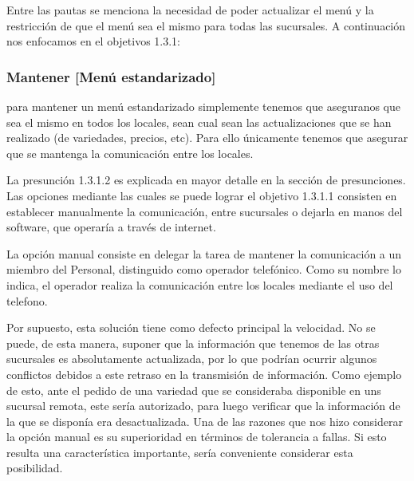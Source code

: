 \documentclass[a4paper,10pt]{article}
\begin{document}
\begin{figure}[H]
\centering
{}
\caption{}
\end{figure}

Entre las pautas se menciona la necesidad de poder actualizar el menú y la restricción de que el menú sea el mismo para todas las sucursales. A continuación nos enfocamos en el objetivos 1.3.1:
\subsubsection*{Mantener [Menú estandarizado]}
para mantener un menú estandarizado simplemente tenemos que aseguranos que sea el mismo en todos los locales, sean cual sean las actualizaciones que se han realizado (de variedades, precios, etc). Para ello únicamente tenemos que asegurar que se mantenga la comunicación entre los locales. \\


\begin{figure}[H]
\centering
{}
\caption{}
\end{figure}

La presunción 1.3.1.2 es explicada en mayor detalle en la sección de presunciones.
Las opciones mediante las cuales se puede lograr el objetivo 1.3.1.1 consisten en establecer manualmente la comunicación, entre sucursales o dejarla en manos del software, que operaría a través de internet. 

La opción manual consiste en delegar la tarea de mantener la comunicación a un miembro del Personal, distinguido como operador telef\'onico. 
Como su nombre lo indica, el operador realiza la comunicaci\'on entre los locales mediante el uso del telefono.

Por supuesto, esta solución tiene como defecto principal la velocidad. No se puede, de esta manera, suponer que la información que tenemos de las otras sucursales es absolutamente actualizada, por lo que podrían ocurrir algunos conflictos debidos a este retraso en la transmisión de información. Como ejemplo de esto, ante el pedido de una variedad que se consideraba disponible en uns sucursal remota, este sería autorizado, para luego verificar que la información de la que se disponía era desactualizada. 
Una de las razones que nos hizo considerar la opción manual es su superioridad en términos de tolerancia a fallas. Si esto resulta una característica importante, sería conveniente considerar esta posibilidad.
\end{document}
